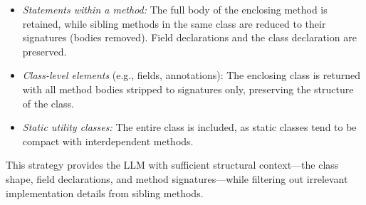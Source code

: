 \begin{itemize}
\item \textit{Statements within a method:} The full body of the 
enclosing method is retained, while sibling methods in the same class 
are reduced to their signatures (bodies removed). Field declarations 
and the class declaration are preserved.
\item \textit{Class-level elements} (e.g., fields, annotations): The 
enclosing class is returned with all method bodies stripped to 
signatures only, preserving the structure of the class.
\item \textit{Static utility classes:} The entire class is included, 
as static classes tend to be compact with interdependent methods.
\end{itemize}

\noindent This strategy provides the LLM with sufficient structural 
context---the class shape, field declarations, and method 
signatures---while filtering out irrelevant implementation details from 
sibling methods. %

